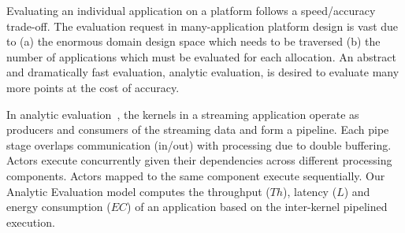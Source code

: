 Evaluating an individual application on a platform follows a speed/accuracy trade-off.
The evaluation request in many-application platform design is vast due to (a) the enormous domain design space which needs to be traversed (b) the number of applications which must be evaluated for each allocation. 
An abstract and dramatically fast evaluation, analytic evaluation, is desired to evaluate many more points at the cost of accuracy.


In analytic evaluation~\cite{Teimouri_TCAD_2018}, the kernels in a streaming application operate as producers and consumers of the streaming data and form a pipeline. 
Each pipe stage overlaps communication (in/out) with processing due to double buffering. Actors execute concurrently given their dependencies across different processing components. Actors mapped to the same component execute sequentially.
Our Analytic Evaluation model computes the throughput ($Th$), latency ($L$) and energy consumption ($EC$) of an application based on the inter-kernel pipelined execution.


